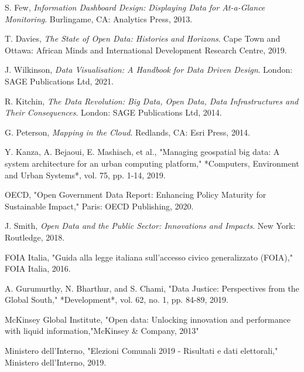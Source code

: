 \clearpage{\pagestyle{empty}\cleardoublepage}


\begin{thebibliography}{99}

S. Few, \textit{Information Dashboard Design: Displaying Data for At-a-Glance Monitoring}. Burlingame, CA: Analytics Press, 2013.

T. Davies, \textit{The State of Open Data: Histories and Horizons}. Cape Town and Ottawa: African Minds and International Development Research Centre, 2019.


J. Wilkinson, \textit{Data Visualisation: A Handbook for Data Driven Design}. London: SAGE Publications Ltd, 2021.

R. Kitchin, \textit{The Data Revolution: Big Data, Open Data, Data Infrastructures and Their Consequences}. London: SAGE Publications Ltd, 2014.


G. Peterson, \textit{Mapping in the Cloud}. Redlands, CA: Esri Press, 2014.

Y. Kanza, A. Bejaoui, E. Mashiach, et al., "Managing geospatial big data: A system architecture for an urban computing platform," *Computers, Environment and Urban Systems*, vol. 75, pp. 1-14, 2019.

OECD, "Open Government Data Report: Enhancing Policy Maturity for Sustainable Impact," Paris: OECD Publishing, 2020.

J. Smith, \textit{Open Data and the Public Sector: Innovations and Impacts}. New York: Routledge, 2018.
 

FOIA Italia, "Guida alla legge italiana sull'accesso civico generalizzato (FOIA)," FOIA Italia, 2016.

A. Gurumurthy, N. Bharthur, and S. Chami, "Data Justice: Perspectives from the Global South," *Development*, vol. 62, no. 1, pp. 84-89, 2019.

McKinsey Global Institute, "Open data: Unlocking innovation and performance with liquid information,"McKinsey \& Company, 2013"

Ministero dell'Interno, "Elezioni Comunali 2019 - Risultati e dati elettorali," Ministero dell'Interno, 2019.


\end{thebibliography}
